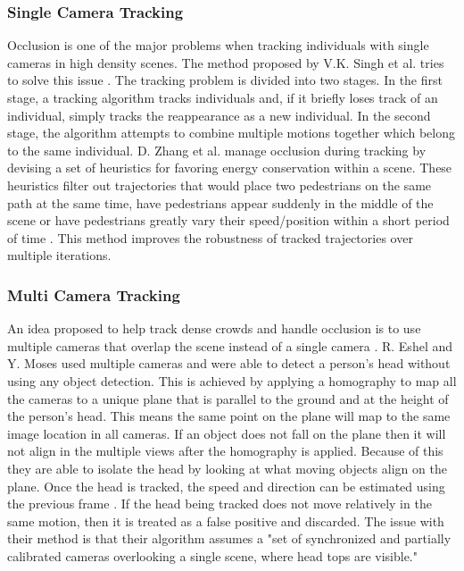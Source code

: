 \documentclass[12pt, onecolumn, conference]{IEEEtran}
\begin{document}
\subsubsection{Single Camera Tracking}

Occlusion is one of the major problems when tracking individuals with single cameras in high density scenes. The method proposed by V.K. Singh et al. tries to solve this issue \cite{V.K. Singh}. The tracking problem is divided into two stages. In the first stage, a tracking algorithm tracks individuals and, if it briefly loses track of an individual, simply tracks the reappearance as a new individual. In the second stage, the algorithm attempts to combine multiple motions together which belong to the same individual.
D. Zhang et al. manage occlusion during tracking by devising a set of heuristics for favoring energy conservation within a scene. These heuristics filter out trajectories that would place two pedestrians on the same path at the same time, have pedestrians appear suddenly in the middle of the scene or have pedestrians greatly vary their speed/position within a short period of time \cite{D. Zhang}. This method improves the robustness of tracked trajectories over multiple iterations.

\subsubsection{Multi Camera Tracking}

An idea proposed to help track dense crowds and handle occlusion is to use multiple cameras that overlap the scene instead of a single camera \cite{R. Eshel}\cite{M. Liem}. R. Eshel and Y. Moses used multiple cameras and were able to detect a person's head without using any object detection\cite{R. Eshel}. This is achieved by applying a homography to map all the cameras to a unique plane that is parallel to the ground and at the height of the person's head. This means the same point on the plane will map to the same image location in all cameras. If an object does not fall on the plane then it will not align in the multiple views after the homography is applied. Because of this they are able to isolate the head by looking at what moving objects align on the plane. Once the head is tracked, the speed and direction can be estimated using the previous frame \cite{R. Eshel}. If the head being tracked does not move relatively in the same motion, then it is treated as a false positive and discarded. The issue with their method is that their algorithm assumes a "set of synchronized and partially calibrated cameras overlooking a single scene, where head tops are visible." 
\end{document}
